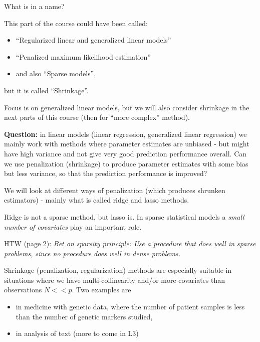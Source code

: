 \documentclass[
  ignorenonframetext,
]{beamer}
\providecommand{\tightlist}{%
  \setlength{\itemsep}{0pt}\setlength{\parskip}{0pt}}
\begin{document}
\begin{frame}

\begin{block}{What is in a name?}

This part of the course could have been called:

\begin{itemize}
\tightlist
\item
  ``Regularized linear and generalized linear models''
\item
  ``Penalized maximum likelihood estimation''
\item
  and also ``Sparse models'',
\end{itemize}

but it is called ``Shrinkage''.

Focus is on generalized linear models, but we will also consider
shrinkage in the next parts of this course (then for ``more complex''
method).

\textbf{Question:} in linear models (linear regression, generalized
linear regression) we mainly work with methods where parameter estimates
are unbiased - but might have high variance and not give very good
prediction performance overall. Can we use penalization (shrinkage) to
produce parameter estimates with some bias but less variance, so that
the prediction performance is improved?

\end{block}

\end{frame}

\begin{frame}

We will look at different ways of penalization (which produces shrunken
estimators) - mainly what is called ridge and lasso methods.

Ridge is not a sparse method, but lasso is. In sparse statistical models
a \emph{small number of covariates} play an important role.

HTW (page 2): \emph{Bet on sparsity principle: Use a procedure that does
well in sparse problems, since no procedure does well in dense
problems.}

Shrinkage (penalization, regularization) methods are especially suitable
in situations where we have multi-collinearity and/or more covariates
than observations \(N<<p\). Two examples are

\begin{itemize}
\tightlist
\item
  in medicine with genetic data, where the number of patient samples is
  less than the number of genetic markers studied,
\item
  in analysis of text (more to come in L3)
\end{itemize}

\end{frame}
\end{document}

